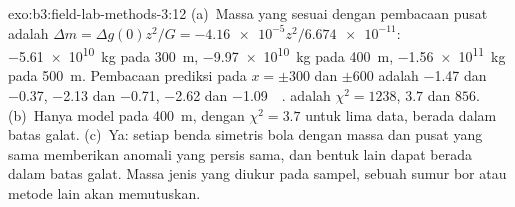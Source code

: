\begin{solution}{exo:b3:field-lab-methods-3:12}
(a)~Massa yang sesuai dengan pembacaan pusat adalah $\Delta m = \Delta g(0)z^2/G
= \num{-4.16e-5}z^2/\num{6.674e-11}$: \qty{-5.61e10}{kg} pada
\qty{300}{m}, \qty{-9.97e10}{kg} pada \qty{400}{m}, \qty{-1.56e11}{kg} pada
\qty{500}{m}. Pembacaan prediksi pada $x = \pm300$ dan $\pm600$ adalah
\num{-1.47} dan \num{-0.37}, \num{-2.13} dan \num{-0.71}, \num{-2.62}
dan \qty{-1.09}{\milli\gal}.  adalah $\chi^2 = 1238$, $3.7$ dan
$856$. (b)~Hanya model pada \qty{400}{m}, dengan $\chi^2 = 3.7$ untuk lima
data, berada dalam batas galat. (c)~Ya: setiap benda simetris bola dengan massa dan pusat yang sama
memberikan anomali yang persis sama, dan bentuk lain
dapat berada dalam batas galat. Massa jenis yang diukur pada sampel, sebuah
sumur bor atau metode lain akan memutuskan.
\end{solution}

